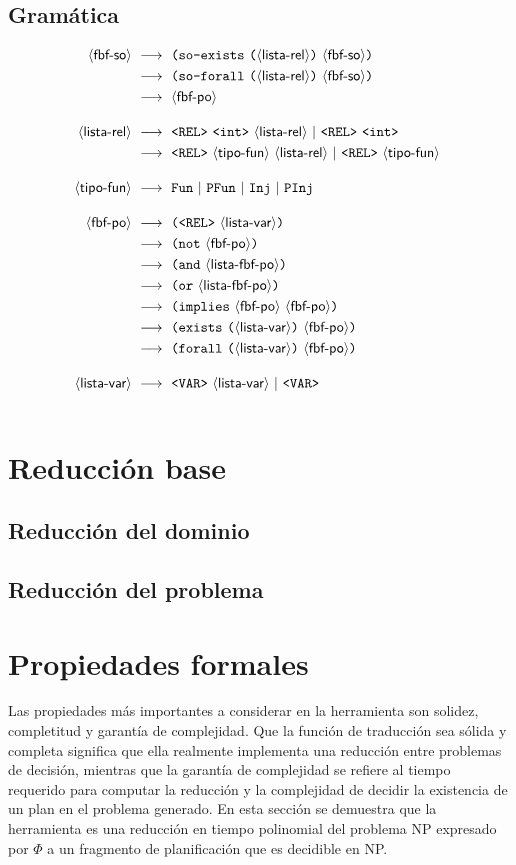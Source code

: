 \subsection{Gramática}
\begin{alignat*}{1}
\sofbf\   & \deriv\ \lpar \SOExists\ \lpar \listrel \rpar\ \sofbf \rpar \\
          & \deriv\ \lpar \SOForall\ \lpar \listrel \rpar\ \sofbf \rpar \\
          & \deriv\ \pofbf \\[1em]
\listrel\ & \deriv\ \rel\ \integer\ \listrel\ |\ \rel\ \integer \\
          & \deriv\ \rel\ \tipof\ \listrel\ |\ \rel\ \tipof\ \\[1em]
\tipof\   & \deriv\ \fun\ |\ \pfun\ |\ \inj\ |\ \pinj\ \\[1em]
\pofbf\   & \deriv\ \lpar \rel\ \listvar \rpar \\
          & \deriv\ \lpar \NOT\ \pofbf \rpar \\
          & \deriv\ \lpar \AND\ \listpofbf \rpar \\
          & \deriv\ \lpar \OR\ \listpofbf \rpar \\
          & \deriv\ \lpar \IMPLIES\ \pofbf\ \pofbf \rpar \\
          & \deriv\ \lpar \Exists\ \lpar \listvar \rpar\ \pofbf \rpar \\
          & \deriv\ \lpar \Forall\ \lpar \listvar \rpar\ \pofbf \rpar \\[1em]
\listvar\ & \deriv\ \var\ \listvar\ |\ \var \\[1em]
\end{alignat*}

\section{Reducción base}
\subsection{Reducción del dominio}
\subsection{Reducción del problema}

\section{Propiedades formales}
Las propiedades más importantes a considerar en la herramienta son solidez,
completitud y garantía de complejidad. Que la función de traducción sea sólida
y completa significa que ella realmente implementa una reducción entre problemas de
decisión, mientras que la garantía de complejidad se refiere al tiempo
requerido para computar la reducción y la complejidad de decidir la existencia
de un plan en el problema generado. En esta sección se demuestra que la 
herramienta es una reducción en tiempo
polinomial del problema NP expresado por $\Phi$ a un fragmento de planificación
que es decidible en NP.

